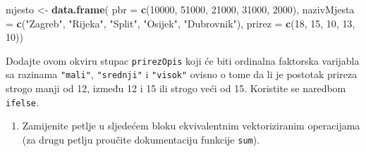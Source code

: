 \documentclass[]{book}
\newenvironment{Shaded}{\begin{snugshade}}{\end{snugshade}}
\newcommand{\KeywordTok}[1]{\textcolor[rgb]{0.13,0.29,0.53}{\textbf{#1}}}
\newcommand{\DataTypeTok}[1]{\textcolor[rgb]{0.13,0.29,0.53}{#1}}
\newcommand{\DecValTok}[1]{\textcolor[rgb]{0.00,0.00,0.81}{#1}}
\newcommand{\StringTok}[1]{\textcolor[rgb]{0.31,0.60,0.02}{#1}}
\newcommand{\ControlFlowTok}[1]{\textcolor[rgb]{0.13,0.29,0.53}{\textbf{#1}}}
\newcommand{\OperatorTok}[1]{\textcolor[rgb]{0.81,0.36,0.00}{\textbf{#1}}}
\newcommand{\NormalTok}[1]{#1}
\providecommand{\tightlist}{%
  \setlength{\itemsep}{0pt}\setlength{\parskip}{0pt}}
\theoremstyle{definition}
\theoremstyle{definition}
\theoremstyle{definition}
\theoremstyle{remark}
\begin{document}
\begin{Shaded}
\begin{Highlighting}[]
\NormalTok{mjesto <-}\StringTok{ }\KeywordTok{data.frame}\NormalTok{( }\DataTypeTok{pbr =} \KeywordTok{c}\NormalTok{(}\DecValTok{10000}\NormalTok{, }\DecValTok{51000}\NormalTok{, }\DecValTok{21000}\NormalTok{, }\DecValTok{31000}\NormalTok{, }\DecValTok{2000}\NormalTok{),}
         \DataTypeTok{nazivMjesta =} \KeywordTok{c}\NormalTok{(}\StringTok{"Zagreb"}\NormalTok{, }\StringTok{"Rijeka"}\NormalTok{, }\StringTok{"Split"}\NormalTok{, }\StringTok{"Osijek"}\NormalTok{, }\StringTok{"Dubrovnik"}\NormalTok{),}
         \DataTypeTok{prirez =} \KeywordTok{c}\NormalTok{(}\DecValTok{18}\NormalTok{, }\DecValTok{15}\NormalTok{, }\DecValTok{10}\NormalTok{, }\DecValTok{13}\NormalTok{, }\DecValTok{10}\NormalTok{))}
\end{Highlighting}
\end{Shaded}

Dodajte ovom okviru stupac \texttt{prirezOpis} koji će biti ordinalna
faktorska varijabla sa razinama \texttt{"mali"}, \texttt{"srednji"} i
\texttt{"visok"} ovisno o tome da li je postotak prireza strogo manji od
12, između 12 i 15 ili strogo veći od 15. Koristite se naredbom
\texttt{ifelse}.

\begin{enumerate}
\def\labelenumi{\arabic{enumi}.}
\setcounter{enumi}{1}
\tightlist
\item
  Zamijenite petlje u sljedećem bloku ekvivalentnim vektoriziranim
  operacijama (za drugu petlju proučite dokumentaciju funkcije
  \texttt{sum}).
\end{enumerate}

\begin{Shaded}
\end{Shaded}
\end{document}
